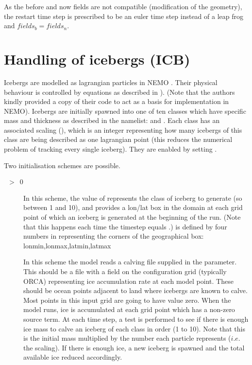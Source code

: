 \documentclass[../tex_main/NEMO_manual]{subfiles}
\begin{document}
As the before and now fields are not compatible (modification of the geometry),
the restart time step is prescribed to be an euler time step instead of a leap frog and $fields_b = fields_n$.
%
\section{Handling of icebergs (ICB)}
\label{sec:ICB_icebergs}


Icebergs are modelled as lagrangian particles in NEMO \citep{Marsh_GMD2015}.
Their physical behaviour is controlled by equations as described in \citet{Martin_Adcroft_OM10} ).
(Note that the authors kindly provided a copy of their code to act as a basis for implementation in NEMO).
Icebergs are initially spawned into one of ten classes which have specific mass and thickness as
described in the  namelist:  and .
Each class has an associated scaling (),
which is an integer representing how many icebergs of this class are being described as one lagrangian point
(this reduces the numerical problem of tracking every single iceberg).
They are enabled by setting .

Two initialisation schemes are possible.
\begin{description}
\item[~$>$~0]
  In this scheme, the value of  represents the class of iceberg to generate
  (so between 1 and 10), and  provides a lon/lat box in the domain at each grid point of
  which an iceberg is generated at the beginning of the run.
  (Note that this happens each time the timestep equals .)
   is defined by four numbers in  representing the corners of
  the geographical box: lonmin,lonmax,latmin,latmax
\item[]
  In this scheme the model reads a calving file supplied in the  parameter.
  This should be a file with a field on the configuration grid (typically ORCA)
  representing ice accumulation rate at each model point.
  These should be ocean points adjacent to land where icebergs are known to calve.
  Most points in this input grid are going to have value zero.
  When the model runs, ice is accumulated at each grid point which has a non-zero source term.
  At each time step, a test is performed to see if there is enough ice mass to
  calve an iceberg of each class in order (1 to 10).
  Note that this is the initial mass multiplied by the number each particle represents ($i.e.$ the scaling).
  If there is enough ice, a new iceberg is spawned and the total available ice reduced accordingly.
\end{description}
\end{document}
